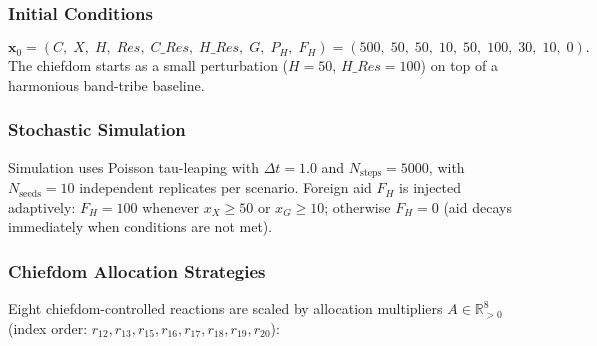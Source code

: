 \subsubsection*{Initial Conditions}

\begin{equation*}
    \mathbf{x}_0 = (C,\;X,\;H,\;\textit{Res},\;C\_\textit{Res},\;
                    H\_\textit{Res},\;G,\;P_H,\;F_H)
                 = (500,\;50,\;50,\;10,\;50,\;100,\;30,\;10,\;0).
\end{equation*}
The chiefdom starts as a small perturbation ($H=50$, $H\_\textit{Res}=100$)
on top of a harmonious band-tribe baseline.

\subsubsection*{Stochastic Simulation}

Simulation uses Poisson tau-leaping with $\Delta t = 1.0$ and
$N_{\text{steps}} = 5000$, with $N_{\text{seeds}} = 10$ independent
replicates per scenario.
Foreign aid $F_H$ is injected adaptively: $F_H = 100$ whenever
$x_X \geq 50$ or $x_G \geq 10$; otherwise $F_H = 0$ (aid decays
immediately when conditions are not met).

\subsubsection*{Chiefdom Allocation Strategies}

Eight chiefdom-controlled reactions are scaled by allocation multipliers
$A \in \mathbb{R}_{>0}^8$ (index order: $r_{12}, r_{13}, r_{15}, r_{16},
r_{17}, r_{18}, r_{19}, r_{20}$):

